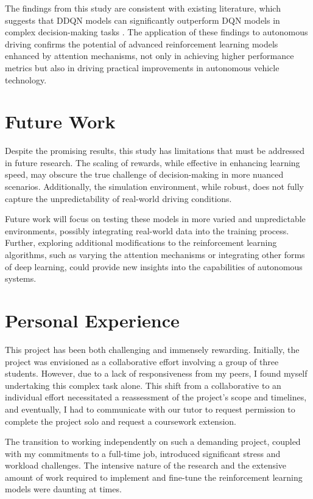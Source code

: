 \documentclass{article}
\begin{document}
The findings from this study are consistent with existing literature, which suggests that DDQN models can significantly outperform DQN models in complex decision-making tasks \citep{8500630}. The application of these findings to autonomous driving confirms the potential of advanced reinforcement learning models enhanced by attention mechanisms, not only in achieving higher performance metrics but also in driving practical improvements in autonomous vehicle technology.

\section{Future Work}

Despite the promising results, this study has limitations that must be addressed in future research. The scaling of rewards, while effective in enhancing learning speed, may obscure the true challenge of decision-making in more nuanced scenarios. Additionally, the simulation environment, while robust, does not fully capture the unpredictability of real-world driving conditions.

Future work will focus on testing these models in more varied and unpredictable environments, possibly integrating real-world data into the training process. Further, exploring additional modifications to the reinforcement learning algorithms, such as varying the attention mechanisms or integrating other forms of deep learning, could provide new insights into the capabilities of autonomous systems.


\section{Personal Experience}

This project has been both challenging and immensely rewarding. Initially, the project was envisioned as a collaborative effort involving a group of three students. However, due to a lack of responsiveness from my peers, I found myself undertaking this complex task alone. This shift from a collaborative to an individual effort necessitated a reassessment of the project's scope and timelines, and eventually, I had to communicate with our tutor to request permission to complete the project solo and request a coursework extension.

The transition to working independently on such a demanding project, coupled with my commitments to a full-time job, introduced significant stress and workload challenges. The intensive nature of the research and the extensive amount of work required to implement and fine-tune the reinforcement learning models were daunting at times.
\end{document}
